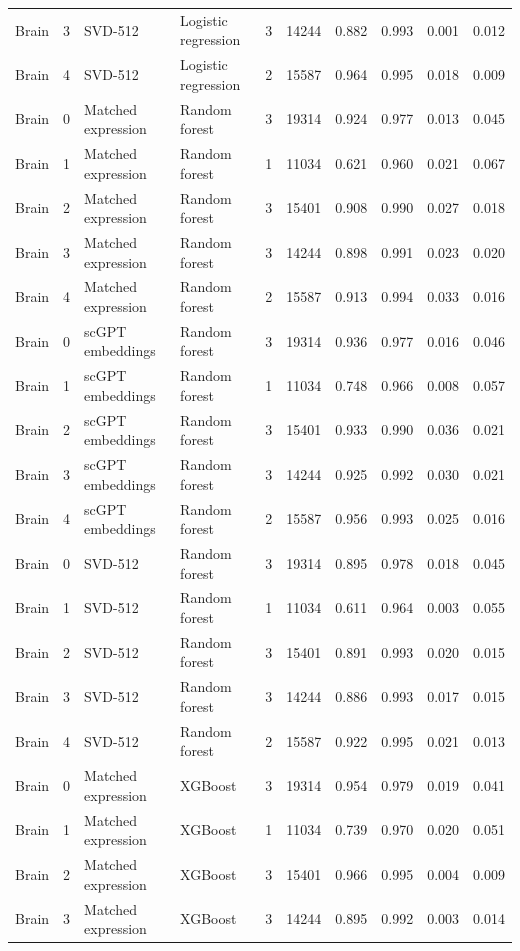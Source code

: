 {\begin{longtable}{lrllrrrrrr}
Brain & 3 & SVD-512 & Logistic regression & 3 & 14244 & 0.882 & 0.993 & 0.001 & 0.012 \\
Brain & 4 & SVD-512 & Logistic regression & 2 & 15587 & 0.964 & 0.995 & 0.018 & 0.009 \\
Brain & 0 & Matched expression & Random forest & 3 & 19314 & 0.924 & 0.977 & 0.013 & 0.045 \\
Brain & 1 & Matched expression & Random forest & 1 & 11034 & 0.621 & 0.960 & 0.021 & 0.067 \\
Brain & 2 & Matched expression & Random forest & 3 & 15401 & 0.908 & 0.990 & 0.027 & 0.018 \\
Brain & 3 & Matched expression & Random forest & 3 & 14244 & 0.898 & 0.991 & 0.023 & 0.020 \\
Brain & 4 & Matched expression & Random forest & 2 & 15587 & 0.913 & 0.994 & 0.033 & 0.016 \\
Brain & 0 & scGPT embeddings & Random forest & 3 & 19314 & 0.936 & 0.977 & 0.016 & 0.046 \\
Brain & 1 & scGPT embeddings & Random forest & 1 & 11034 & 0.748 & 0.966 & 0.008 & 0.057 \\
Brain & 2 & scGPT embeddings & Random forest & 3 & 15401 & 0.933 & 0.990 & 0.036 & 0.021 \\
Brain & 3 & scGPT embeddings & Random forest & 3 & 14244 & 0.925 & 0.992 & 0.030 & 0.021 \\
Brain & 4 & scGPT embeddings & Random forest & 2 & 15587 & 0.956 & 0.993 & 0.025 & 0.016 \\
Brain & 0 & SVD-512 & Random forest & 3 & 19314 & 0.895 & 0.978 & 0.018 & 0.045 \\
Brain & 1 & SVD-512 & Random forest & 1 & 11034 & 0.611 & 0.964 & 0.003 & 0.055 \\
Brain & 2 & SVD-512 & Random forest & 3 & 15401 & 0.891 & 0.993 & 0.020 & 0.015 \\
Brain & 3 & SVD-512 & Random forest & 3 & 14244 & 0.886 & 0.993 & 0.017 & 0.015 \\
Brain & 4 & SVD-512 & Random forest & 2 & 15587 & 0.922 & 0.995 & 0.021 & 0.013 \\
Brain & 0 & Matched expression & XGBoost & 3 & 19314 & 0.954 & 0.979 & 0.019 & 0.041 \\
Brain & 1 & Matched expression & XGBoost & 1 & 11034 & 0.739 & 0.970 & 0.020 & 0.051 \\
Brain & 2 & Matched expression & XGBoost & 3 & 15401 & 0.966 & 0.995 & 0.004 & 0.009 \\
Brain & 3 & Matched expression & XGBoost & 3 & 14244 & 0.895 & 0.992 & 0.003 & 0.014 \\

\end{longtable}}
